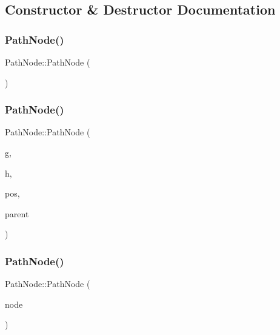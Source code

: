 \subsection{Constructor \& Destructor Documentation}
\mbox{\label{struct_path_node_a8407a02423706e133bfea2b4c872289a}} 
\subsubsection{\texorpdfstring{PathNode()}{PathNode()}\hspace{0.1cm}{\footnotesize\ttfamily [1/3]}}
{\footnotesize\ttfamily Path\+Node\+::\+Path\+Node (\begin{DoxyParamCaption}{ }\end{DoxyParamCaption})}

\mbox{\label{struct_path_node_af400d4d6c48f5a19aa392ca9a64e6927}} 
\subsubsection{\texorpdfstring{PathNode()}{PathNode()}\hspace{0.1cm}{\footnotesize\ttfamily [2/3]}}
{\footnotesize\ttfamily Path\+Node\+::\+Path\+Node (\begin{DoxyParamCaption}\item[{int}]{g,  }\item[{int}]{h,  }\item[{const pair$<$ int, int $>$ \&}]{pos,  }\item[{const \mbox{\hyperlink{struct_path_node}{Path\+Node}} $\ast$}]{parent }\end{DoxyParamCaption})}

\mbox{\label{struct_path_node_af7a498e596d25ff091e493c54f1edf05}} 
\subsubsection{\texorpdfstring{PathNode()}{PathNode()}\hspace{0.1cm}{\footnotesize\ttfamily [3/3]}}
{\footnotesize\ttfamily Path\+Node\+::\+Path\+Node (\begin{DoxyParamCaption}\item[{const \mbox{\hyperlink{struct_path_node}{Path\+Node}} \&}]{node }\end{DoxyParamCaption})}



